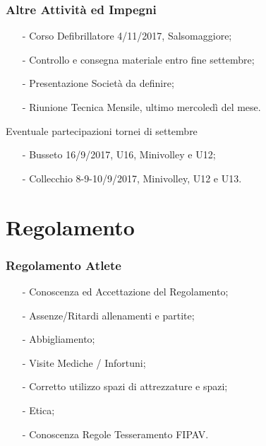 \documentclass{beamer}
\begin{document}
\begin{frame}
\frametitle{Altre Attività ed Impegni}
\begin{itemize}
\item[-]Corso Defibrillatore 4/11/2017, Salsomaggiore;
\item[-]Controllo e consegna materiale entro fine settembre;
\item[-]Presentazione Società da definire;
\item[-]Riunione Tecnica Mensile, ultimo mercoledì del mese.
\end{itemize}

\begin{block}{Eventuale partecipazioni tornei di settembre}
\begin{itemize}
\item[-]Busseto 16/9/2017, U16, Minivolley e U12;
\item[-]Collecchio 8-9-10/9/2017, Minivolley, U12 e U13.
\end{itemize}
\end{block}
\end{frame}

\section{Regolamento}


\begin{frame}
\frametitle{Regolamento Atlete}
\begin{itemize}
\item[-]Conoscenza ed Accettazione del Regolamento;
\item[-]Assenze/Ritardi allenamenti e partite;
\item[-]Abbigliamento;
\item[-]Visite Mediche / Infortuni;
\item[-]Corretto utilizzo spazi di attrezzature e spazi;
\item[-]Etica;
\item[-]Conoscenza Regole Tesseramento FIPAV.
\end{itemize}
\end{frame}
\end{document}
